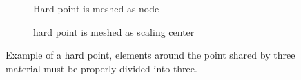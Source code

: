     \begin{figure}[h!]
        \begin{subfigure}[b]{0.5\linewidth}
            \centering
        \caption{Hard point is meshed as node}
        \end{subfigure}
        \begin{subfigure}[b]{0.5\linewidth}
            \centering
        \caption{hard point is meshed as scaling center}
        \label{qdt_fig:qdt_hard_point_demo_sc}
        \end{subfigure}
        \caption[Example of a hard point]{Example of a hard point, elements around the point shared by three material must be properly divided into three.}
        \label{qdt_fig:qdt_hard_point_demo}
    \end{figure}
